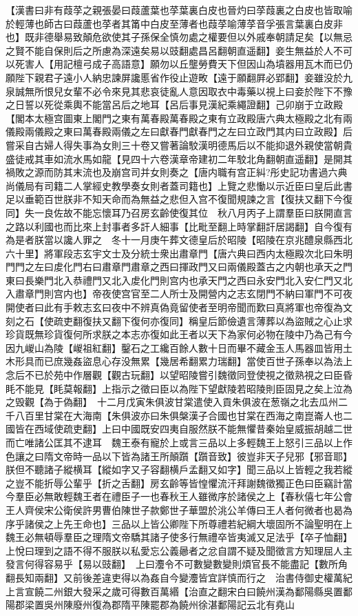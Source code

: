 【漢書曰非有葭莩之親張晏曰葭蘆葉也莩葉裏白皮也晉灼曰莩葭裏之白皮也皆取喻於輕薄也師古曰葭蘆也莩者其筩中白皮至薄者也葭莩喻薄莩音孚張言葉裏白皮非也】既非德舉易致顛危欲使其子孫保全慎勿處之權要但以外戚奉朝請足矣【以無忌之賢不能自保則后之所慮為深遠矣易以豉翻處昌呂翻朝直遥翻】妾生無益於人不可以死害人【用記檀弓成子高語意】願勿以丘壟勞費天下但因山為墳器用瓦木而已仍願陛下親君子遠小人納忠諫屏讒慝省作役止遊畋【遠于願翻屛必郢翻】妾雖没於九泉誠無所恨兒女輩不必令來見其悲哀徒亂人意因取衣中毒藥以視上曰妾於陛下不豫之日誓以死從乘輿不能當呂后之地耳【呂后事見漢紀乘繩證翻】己卯崩于立政殿【閣本太極宫圖東上閣門之東有萬春殿萬春殿之東有立政殿唐六典太極殿之北有兩儀殿兩儀殿之東曰萬春殿兩儀之左曰獻春門獻春門之左曰立政門其内曰立政殿】后嘗采自古婦人得失事為女則三十卷又嘗著論駮漢明德馬后以不能抑退外親使當朝貴盛徒戒其車如流水馬如龍【見四十六卷漢章帝建初二年駮北角翻朝直遥翻】是開其禍敗之源而防其末流也及崩宫司并女則奏之【唐内職有宫正糾?彤史記功書過六典尚儀局有司籍二人掌經史教學奏女則者蓋司籍也】上覽之悲慟以示近臣曰皇后此書足以垂範百世朕非不知天命而為無益之悲但入宫不復聞規諫之言【復扶又翻下今復同】失一良佐故不能忘懷耳乃召房玄齡使復其位　秋八月丙子上謂羣臣曰朕開直言之路以利國也而比來上封事者多訐人細事【比毗至翻上時掌翻訐居謁翻】自今復有為是者朕當以讒人罪之　冬十一月庚午葬文德皇后於昭陵【昭陵在京兆醴泉縣西北六十里】將軍段志玄宇文士及分統士衆出肅章門【唐六典曰西内太極殿次北曰朱明門門之左曰䖍化門右曰肅章門肅章之西曰揮政門又曰兩儀殿蓋古之内朝也承天之門東曰長樂門北入恭禮門又北入䖍化門則宫内也承天門之西曰永安門北入安仁門又北入肅章門則宫内也】帝夜使宫官至二人所士及開營内之志玄閉門不納曰軍門不可夜開使者曰此有手敕志玄曰夜中不辨真偽竟留使者至明帝聞而歎曰真將軍也帝復為文刻之石【使疏吏翻復扶又翻下復何亦復同】稱皇后節儉遺言薄葬以為盜賊之心止求珍貨既無珍貨復何所求朕之本志亦復如此王者以天下為家何必物在陵中乃為己有今因九嵕山為陵【嵕祖紅翻】鑿石之工纔百餘人數十日而畢不藏金玉人馬器皿皆用土木形具而已庶幾姦盜息心存没無累【幾居希翻累力瑞翻】當使百世子孫奉以為法上念后不已於苑中作層觀【觀古玩翻】以望昭陵嘗引魏徵同登使視之徵熟視之曰臣昏眊不能見【眊莫報翻】上指示之徵曰臣以為陛下望獻陵若昭陵則臣固見之矣上泣為之毁觀【為于偽翻】　十二月戊寅朱俱波甘棠遣使入貢朱俱波在葱嶺之北去瓜州二千八百里甘棠在大海南【朱俱波亦曰朱俱槃漢子合國也甘棠在西海之南崑崙人也二國皆在西域使疏吏翻】上曰中國既安四夷自服然朕不能無懼昔秦始皇威振胡越二世而亡唯諸公匡其不逮耳　魏王泰有寵於上或言三品以上多輕魏王上怒引三品以上作色讓之曰隋文帝時一品以下皆為諸王所顛躓【躓音致】彼豈非天子兒邪【邪音耶】朕但不聽諸子縱横耳【縱如字又子容翻横戶孟翻又如字】聞三品以上皆輕之我若縱之豈不能折辱公輩乎【折之舌翻】房玄齡等皆惶懼流汗拜謝魏徵獨正色曰臣竊計當今羣臣必無敢輕魏王者在禮臣子一也春秋王人雖微序於諸侯之上【春秋僖七年公會王人齊侯宋公衛侯許男曹伯陳世子款鄭世子華盟於洮公羊傳曰王人者何微者也曷為序乎諸侯之上先王命也】三品以上皆公卿陛下所尊禮若紀綱大壞固所不論聖明在上魏王必無頓辱羣臣之理隋文帝驕其諸子使多行無禮卒皆夷滅又足法乎【卒子恤翻】上悅曰理到之語不得不服朕以私愛忘公義曏者之忿自謂不疑及聞徵言方知理屈人主發言何得容易乎【易以豉翻】　上曰灋令不可數變數變則煩官長不能盡記【數所角翻長知兩翻】又前後差違吏得以為姦自今變灋皆宜詳慎而行之　治書侍御史權萬紀上言宣饒二州銀大發采之歲可得數百萬緡【治直之翻宋白曰饒州漢為鄱陽縣吳置鄱陽郡梁置吳州陳廢州復為郡隋平陳罷郡為饒州徐湛鄱陽記云北有堯山
